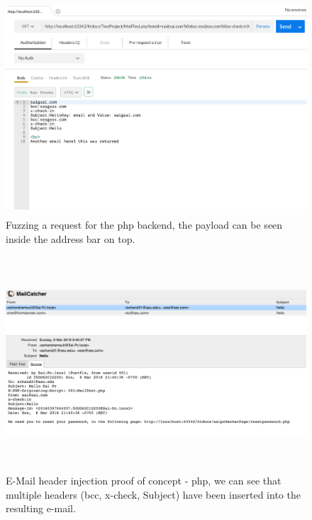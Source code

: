 \begin{figure}[!htbp]
	\centering
	\includegraphics[width=14cm, height=8cm]{System/EMI_Postman_PHP}
	\caption[Fuzzing a request for the php backend]{Fuzzing a request for the php backend, the payload can be seen inside the address bar on top.}
	\label{fig:postmanphp}
\end{figure}

\begin{figure}[!htbp]
	\centering
	\includegraphics[width=14cm, height=8cm]{System/EMI_Mailcatcher_PHP}
	\caption[E-Mail header injection proof of concept - php]{E-Mail header injection proof of concept - php, we can see that multiple headers (bcc, x-check, Subject) have been inserted into the resulting e-mail.}
	\label{fig:mailcatcherphp}
\end{figure}